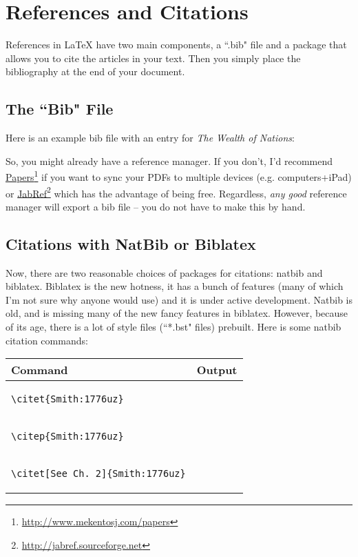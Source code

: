\section{References and Citations}

References in LaTeX have two main components, a ``.bib" file and a package that allows you to cite the articles in your text.  Then you simply place the bibliography at the end of your document.  

\subsection{The ``Bib" File}

Here is an example bib file with an entry for \emph{The Wealth of Nations}: 

\begin{quote}
	
\end{quote}

So, you might already have a reference manager.  If you don't, I'd recommend \href{http://www.mekentosj.com/papers/}{Papers}\footnote{\href{http://www.mekentosj.com/papers/}{http:/\slash www.mekentosj.com\slash papers}} if you want to sync your PDFs to multiple devices (e.g. computers+iPad) or \href{http://jabref.sourceforge.net}{JabRef}\footnote{\href{http://jabref.sourceforge.net}{http:/\slash jabref.sourceforge.net}} which has the advantage of being free.  Regardless, \emph{any good} reference manager will export a bib file -- you do not have to make this by hand.  

\subsection{Citations with NatBib or Biblatex}

Now, there are two reasonable choices of packages for citations: natbib and biblatex. Biblatex is the new hotness, it has a bunch of features (many of which I'm not sure why anyone would use) and it is under active development. Natbib is old, and is missing many of the new fancy features in biblatex.  However, because of its age, there is a lot of style files (``*.bst" files) prebuilt.  Here is some natbib citation commands:

\begin{table}[h]
\centering
	\begin{tabular}{m{8cm}l}
		Command       & Output \tabularnewline \hline
 		 \begin{verbatim}\citet{Smith:1776uz}\end{verbatim}
 		& \citet{Smith:1776uz}      \tabularnewline 
 		\begin{verbatim}\citep{Smith:1776uz}\end{verbatim}
 		& \citep{Smith:1776uz}			\tabularnewline
 		\begin{verbatim}\citet[See Ch. 2]{Smith:1776uz}\end{verbatim}
 		& \citet[See Ch. 2]{Smith:1776uz}     \tabularnewline
 	\end{tabular}
\end{table}

